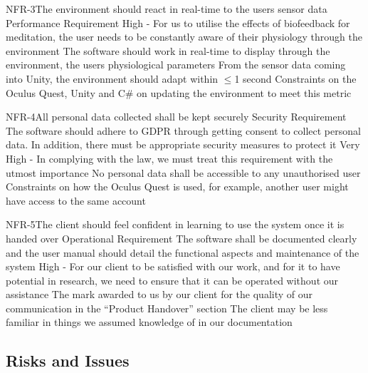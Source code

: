 \documentclass[coverpage,lineno]{../custom}
\begin{document}
\NonFunctionalReqSec
{NFR-3}{The environment should react in real-time to the users sensor data}
{Performance Requirement}
{High - For us to utilise the effects of biofeedback for meditation, the user needs to be constantly aware of their physiology through the environment}
{The software should work in real-time to display through the environment, the users physiological parameters}
{From the sensor data coming into Unity, the environment should adapt within $\le$1 second}
{Constraints on the Oculus Quest, Unity and C\# on updating the environment to meet this metric}

\NonFunctionalReqSec
{NFR-4}{All personal data collected shall be kept securely}
{Security Requirement}
{The software should adhere to GDPR through getting consent to collect personal data. In addition, there must be appropriate security measures to protect it}
{Very High - In complying with the law, we must treat this requirement with the utmost importance}
{No personal data shall be accessible to any unauthorised user}
{Constraints on how the Oculus Quest is used, for example, another user might have access to the same account}



\NonFunctionalReqSec
{NFR-5}{The client should feel confident in learning to use the system once it is handed over}
{Operational Requirement}
{The software shall be documented clearly and the user manual should detail the functional aspects and maintenance of the system}
{High - For our client to be satisfied with our work, and for it to have potential in research, we need to ensure that it can be operated without our assistance}
{The mark awarded to us by our client for the quality of our communication in the ``Product Handover'' section}
{The client may be less familiar in things we assumed knowledge of in our documentation}

\subsection{Risks and Issues}
\label{ssec:risks}
\end{document}
